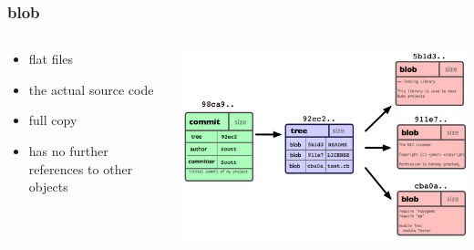 \begin{frame}[fragile]
	\frametitle{blob}

	\begin{columns}
	\begin{column}{0.5\textwidth}
		\begin{itemize}
		\item flat files
		\item the actual source code
		\item full copy
		\item has no further references to other objects
		\end{itemize}
	\end{column}
	\begin{column}{0.5\textwidth}
		\includegraphics[width=\textwidth]{images/object-types.png}
	\end{column}
	\end{columns}

\end{frame}

